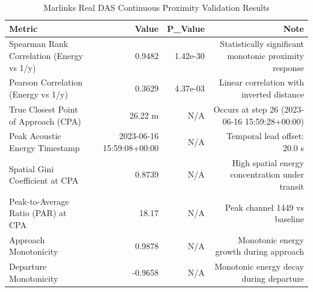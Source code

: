 \begin{table}[htbp]
\centering
\caption{Marlinks Real DAS Continuous Proximity Validation Results}
\begin{tabular}{lrrr}
\toprule
Metric & Value & P\_Value & Note \\
\midrule
Spearman Rank Correlation (Energy vs 1/y) & 0.9482 & 1.42e-30 & Statistically significant monotonic proximity response \\
Pearson Correlation (Energy vs 1/y) & 0.3629 & 4.37e-03 & Linear correlation with inverted distance \\
True Closest Point of Approach (CPA) & 26.22 m & N/A & Occurs at step 26 (2023-06-16 15:59:28+00:00) \\
Peak Acoustic Energy Timestamp & 2023-06-16 15:59:08+00:00 & N/A & Temporal lead offset: 20.0 s \\
Spatial Gini Coefficient at CPA & 0.8739 & N/A & High spatial energy concentration under transit \\
Peak-to-Average Ratio (PAR) at CPA & 18.17 & N/A & Peak channel 1449 vs baseline \\
Approach Monotonicity & 0.9878 & N/A & Monotonic energy growth during approach \\
Departure Monotonicity & -0.9658 & N/A & Monotonic energy decay during departure \\
\bottomrule
\end{tabular}
\end{table}
